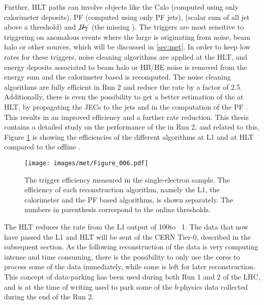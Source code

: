 Further, HLT paths can involve objects like the Calo \ptmiss (computed using only calorimeter deposits), PF \ptmiss (computed using only PF jets), \HT (scalar sum of all jet \pt above a threshold) and $\cancel{H_{\mathrm{T}}}$ (the missing \HT). 
The \ptmiss triggers are most sensitive to triggering on anomalous events where the large \ptmiss is originating from noise, beam halo or other sources, which will be discussed in \ref{sec:met}. 
In order to keep low rates for these triggers, noise cleaning algorithms are applied at the HLT, and energy deposits associated to beam halo or HB/HE noise is removed from the energy sum and the calorimeter based \ptmiss is recomputed. 
The noise cleaning algorithms are fully efficient in Run 2 and reduce the rate by a factor of 2.5. 
Additionally, there is even the possibility to get a better estimation of the \ptmiss at HLT, by propagating the JECs to the jets and in the computation of the PF \ptmiss. 
This results in an improved efficiency and a further rate reduction. 
This thesis contains a detailed study on the performance of the \ptmiss in Run 2, and related to this, Figure \ref{fig:triggerMET} is showing the efficiencies of the different \ptmiss algorithms at L1 and at HLT compared to the offline \ptmiss.   
\begin{figure}[!htp]
  \centering
   \texttt{[image: images/met/Figure\_006.pdf]}
   \caption{The \ptmiss trigger efficiency measured in the single-electron sample. The efficiency of each reconstruction algorithm, namely the L1, the calorimeter and the PF based \ptmiss algorithms, is shown separately. The numbers in parenthesis correspond to the online \ptmiss thresholds.}
   \label{fig:triggerMET}
\end{figure}                                                                         
The HLT reduces the rate from the L1 output of 100\kHz to ~1\kHz. The data that now have passed the L1 and HLT will be sent of the CERN Tier-0, described in the subsequent section. 
As the following reconstruction of the data is very computing intense and time consuming, there is the possibility to only use the cores to process some of the data immediately, while some is left for later reconstruction. 
This concept of data-parking has been used during both Run 1 and 2 of the LHC, and is at the time of writing used to park some of the $b$-physics data collected during the end of the Run 2. 
